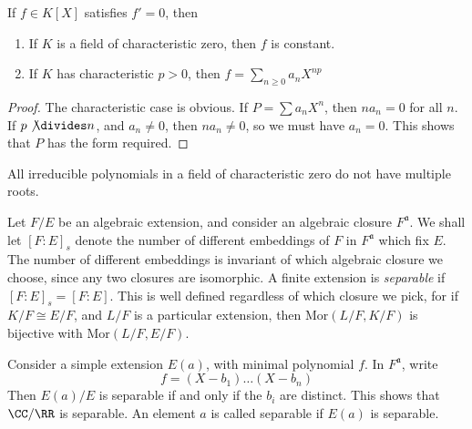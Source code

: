 \begin{theorem}
    If $f \in K[X]$ satisfies $f' = 0$, then
    \begin{enumerate}
        \item If $K$ is a field of characteristic zero, then $f$ is constant.
        \item If $K$ has characteristic $p > 0$, then $f = \sum_{n \geq 0} a_n X^{np}$
    \end{enumerate}
\end{theorem}
\begin{proof}
    The characteristic case is obvious. If $P = \sum a_n X^n$, then $n a_n = 0$ for all $n$. If $p \not \divides n$, and $a_n \neq 0$, then $n a_n \neq 0$, so we must have $a_n = 0$. This shows that $P$ has the form required.
\end{proof}

\begin{corollary}
    All irreducible polynomials in a field of characteristic zero do not have multiple roots.
\end{corollary}

Let $F/E$ be an algebraic extension, and consider an algebraic closure $F^{\mathfrak{a}}$. We shall let $[F:E]_s$ denote the number of different embeddings of $F$ in $F^{\mathfrak{a}}$ which fix $E$. The number of different embeddings is invariant of which algebraic closure we choose, since any two closures are isomorphic. A finite extension is \emph{separable} if $[F:E]_s = [F:E]$. This is well defined regardless of which closure we pick, for if $K/F \cong E/F$, and $L/F$ is a particular extension, then $\text{Mor}(L/F,K/F)$ is bijective with $\text{Mor}(L/F,E/F)$.

\begin{example}
    Consider a simple extension $E(a)$, with minimal polynomial $f$. In $F^{\mathfrak{a}}$, write
    \[ f = (X - b_1) \dots (X - b_n) \]
    Then $E(a)/E$ is separable if and only if the $b_i$ are distinct. This shows that $\CC/\RR$ is separable. An element $a$ is called separable if $E(a)$ is separable.
\end{example}

